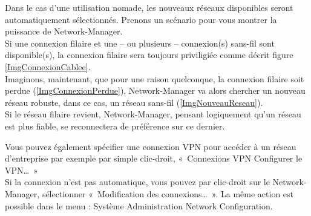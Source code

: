 \begin{nota}
Dans le cas d'une utilisation nomade, les nouveaux réseaux disponibles seront automatiquement sélectionnés. Prenons un scénario pour vous montrer la puissance de Network-Manager.\\
Si une connexion filaire et une -- ou plusieurs -- connexion(s) sans-fil sont disponible(s), la connexion filaire sera toujours priviligiée comme décrit figure \ref{ImgConnexionCablee}.\\
Imaginons, maintenant, que pour une raison quelconque, la connexion filaire soit perdue (\ref{ImgConnexionPerdue}), Network-Manager va alors chercher un nouveau réseau robuste, dans ce cas, un réseau sans-fil (\ref{ImgNouveauReseau}).\\
Si le réseau filaire revient, Network-Manager, pensant logiquement qu'un réseau  est plus fiable, se reconnectera de préférence sur ce dernier.\par
\GestionReseauNM
\end{nota}
Vous pouvez également spécifier une connexion VPN pour accéder à un réseau d'entreprise par exemple par simple clic-droit, «~Connexions VPN \FlecheDroite Configurer le VPN\ldots{}~»\\
Si la connexion n'est pas automatique, vous pouvez par clic-droit sur le Network-Manager, sélectionner «~Modification des connexions\ldots{}~». La même action est possible dans le menu : Système \FlecheDroite Administration \FlecheDroite Network Configuration.

